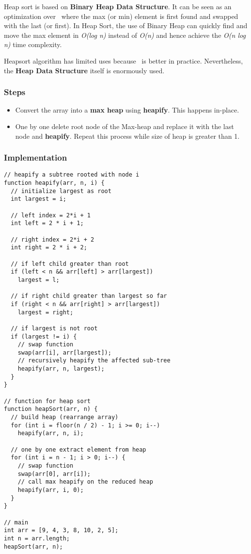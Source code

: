 Heap sort is based on \textbf{Binary Heap Data Structure}. It can be seen as an optimization over \selectionsrt\ where the max (or min) element is first found and swapped with the last (or first). In Heap Sort, the use of Binary Heap can quickly find and move the max element in \textit{O(log n)} instead of \textit{O(n)} and hence achieve the \textit{O(n log n)} time complexity.

Heapsort algorithm has limited uses because \quicksrt\ is better in practice. Nevertheless, the \textbf{Heap Data Structure} itself is enormously used.

\subsubsection*{Steps}

\begin{itemize}
  \item Convert the array into a \textbf{max heap} using \textbf{heapify}. This happens in-place.
  \item One by one delete root node of the Max-heap and replace it with the last node and \textbf{heapify}. Repeat this process while size of heap is greater than 1.
\end{itemize}

\subsubsection*{Implementation}

\begin{lstlisting}[style=general]
// heapify a subtree rooted with node i
function heapify(arr, n, i) {
  // initialize largest as root
  int largest = i;

  // left index = 2*i + 1
  int left = 2 * i + 1;

  // right index = 2*i + 2
  int right = 2 * i + 2;

  // if left child greater than root
  if (left < n && arr[left] > arr[largest])
    largest = l;

  // if right child greater than largest so far
  if (right < n && arr[right] > arr[largest])
    largest = right;

  // if largest is not root
  if (largest != i) {
    // swap function
    swap(arr[i], arr[largest]);
    // recursively heapify the affected sub-tree
    heapify(arr, n, largest);
  }
}

// function for heap sort
function heapSort(arr, n) {
  // build heap (rearrange array)
  for (int i = floor(n / 2) - 1; i >= 0; i--)
    heapify(arr, n, i);

  // one by one extract element from heap
  for (int i = n - 1; i > 0; i--) {
    // swap function
    swap(arr[0], arr[i]);
    // call max heapify on the reduced heap
    heapify(arr, i, 0);
  }
}

// main
int arr = [9, 4, 3, 8, 10, 2, 5];
int n = arr.length;
heapSort(arr, n);
\end{lstlisting}

